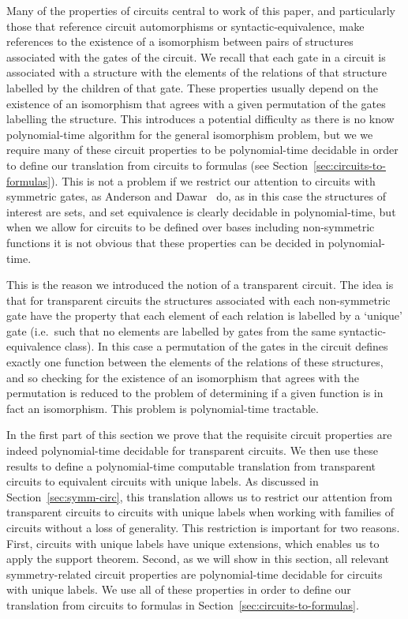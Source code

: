\documentclass[../paper.tex]{subfiles}
\begin{document}
Many of the properties of circuits central to work of this paper, and
particularly those that reference circuit automorphisms or
syntactic-equivalence, make references to the existence of a isomorphism between
pairs of structures associated with the gates of the circuit. We recall that
each gate in a circuit is associated with a structure with the elements of the
relations of that structure labelled by the children of that gate. These
properties usually depend on the existence of an isomorphism that agrees with a
given permutation of the gates labelling the structure. This introduces a
potential difficulty as there is no know polynomial-time algorithm for the
general isomorphism problem, but we we require many of these circuit properties
to be polynomial-time decidable in order to define our translation from circuits
to formulas (see Section~\ref{sec:circuits-to-formulas}). This is not a problem
if we restrict our attention to circuits with symmetric gates, as Anderson and
Dawar~\cite{AndersonD17} do, as in this case the structures of interest are
sets, and set equivalence is clearly decidable in polynomial-time, but when we
allow for circuits to be defined over bases including non-symmetric functions it
is not obvious that these properties can be decided in polynomial-time.

This is the reason we introduced the notion of a transparent circuit. The idea
is that for transparent circuits the structures associated with each
non-symmetric gate have the property that each element of each relation is
labelled by a `unique' gate (i.e.\ such that no elements are labelled by gates
from the same syntactic-equivalence class). In this case a permutation of the
gates in the circuit defines exactly one function between the elements of the
relations of these structures, and so checking for the existence of an
isomorphism that agrees with the permutation is reduced to the problem of
determining if a given function is in fact an isomorphism. This problem is
polynomial-time tractable.

In the first part of this section we prove that the requisite circuit properties
are indeed polynomial-time decidable for transparent circuits. We then use these
results to define a polynomial-time computable translation from transparent
circuits to equivalent circuits with unique labels. As discussed in
Section~\ref{sec:symm-circ}, this translation allows us to restrict our
attention from transparent circuits to circuits with unique labels when working
with families of circuits without a loss of generality. This restriction is
important for two reasons. First, circuits with unique labels have unique
extensions, which enables us to apply the support theorem. Second, as we will
show in this section, all relevant symmetry-related circuit properties are
polynomial-time decidable for circuits with unique labels. We use all of these
properties in order to define our translation from circuits to formulas in
Section~\ref{sec:circuits-to-formulas}.
\end{document}
